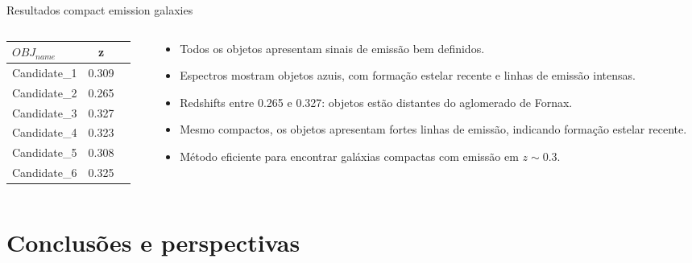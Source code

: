 \begin{frame}[c]{Resultados compact emission galaxies}
\begin{columns}[c]
    \begin{column}{0.45\textwidth}
        \begin{table}[h]
            \centering
            \begin{tabular}{lcc}
                \toprule
                $OBJ_{name}$ & z   \\
                \midrule
                Candidate\_1     & 0.309 \\
                Candidate\_2     & 0.265 \\
                Candidate\_3     & 0.327 \\
                Candidate\_4     & 0.323 \\
                Candidate\_5     & 0.308 \\
                Candidate\_6     & 0.325 \\
                \bottomrule
            \end{tabular}
        \end{table}
    \end{column}
    \begin{column}{0.55\textwidth}
        \vspace{0.3cm}
        \begin{itemize}
            \item Todos os objetos apresentam sinais de emissão bem definidos.
            \item Espectros mostram objetos azuis, com formação estelar recente e linhas de emissão intensas.
            \item Redshifts entre 0.265 e 0.327: objetos estão distantes do aglomerado de Fornax.
            \item Mesmo compactos, os objetos apresentam fortes linhas de emissão, indicando formação estelar recente.
            \item Método eficiente para encontrar galáxias compactas com emissão em $z \sim 0.3$.
        \end{itemize}
    \end{column}
\end{columns}
\end{frame}

\section{Conclusões e perspectivas}


